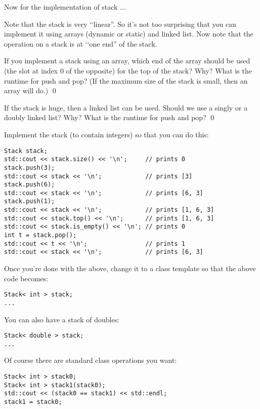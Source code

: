 Now for the implementation of stack ...

Note that the stack is very \lq\lq linear''. 
So it's not too surprising that you can implement it using arrays (dynamic or static)
and linked list.
Now note that the operation on a stack is at \lq\lq one end'' of the stack.

\begin{ex}
If you implement a stack using an array, which end of the array should be
used (the slot at index 0 of the opposite) for the top of the stack?
Why?
What is the runtime for push and pop?
(If the maximum size of the stack is small, then an array will do.)
\qed
\end{ex}

\begin{ex}
If the stack is huge, then a linked list can be used.
Should we use a singly or a doubly linked list?
Why?
What is the runtime for push and pop?
\qed
\end{ex}


\begin{ex}
Implement the stack (to contain integers) so that you can do this:
\begin{Verbatim}[frame=single,fontsize=\footnotesize]
Stack stack;
std::cout << stack.size() << '\n';     // prints 0
stack.push(3);                      
std::cout << stack << '\n';            // prints [3]
stack.push(6);
std::cout << stack << '\n';            // prints [6, 3] 
stack.push(1);
std::cout << stack << '\n';            // prints [1, 6, 3]
std::cout << stack.top() << '\n';      // prints [1, 6, 3]
std::cout << stack.is_empty() << '\n'; // prints 0 
int t = stack.pop();
std::cout << t << '\n';                // prints 1
std::cout << stack << '\n';            // prints [6, 3]
\end{Verbatim}
\end{ex}

\begin{ex}
Once you're done with the above, change it to a class template so that the above
code becomes:
\begin{Verbatim}[frame=single,fontsize=\footnotesize]
Stack< int > stack;
...
\end{Verbatim}
You can also have a stack of doubles:
\begin{Verbatim}[frame=single,fontsize=\footnotesize]
Stack< double > stack;
...
\end{Verbatim}
\end{ex}


\begin{ex}
Of course there are standard class operations you want:
\begin{Verbatim}[frame=single,fontsize=\footnotesize]
Stack< int > stack0;
Stack< int > stack1(stack0);
std::cout << (stack0 == stack1) << std::endl;
stack1 = stack0;
\end{Verbatim}
\end{ex}
